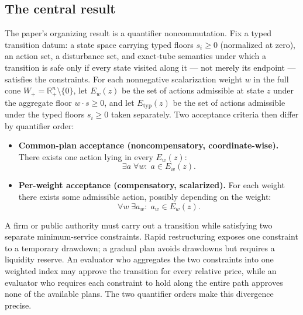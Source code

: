 \documentclass[review,11pt]{elsarticle}
\providecommand{\tightlist}{\setlength{\itemsep}{0pt}\setlength{\parskip}{0pt}}
\begin{document}
\subsection{The central result}\label{the-central-result}

The paper's organizing result is a quantifier noncommutation. Fix a
typed transition datum: a state space carrying typed floors
\(s_i \ge 0\) (normalized at zero), an action set, a disturbance set,
and exact-tube semantics under which a transition is safe only if every
state visited along it --- not merely its endpoint --- satisfies the
constraints. For each nonnegative scalarization weight \(w\) in the full
cone \(W_+ = \mathbb{R}^n_+ \setminus \{0\}\), let \(E_w(z)\) be the set
of actions admissible at state \(z\) under the aggregate floor
\(w \cdot s \ge 0\), and let \(E_{\mathrm{typ}}(z)\) be the set of
actions admissible under the typed floors \(s_i \ge 0\) taken
separately. Two acceptance criteria then differ by quantifier order:

\begin{itemize}
\tightlist
\item
  \textbf{Common-plan acceptance (noncompensatory, coordinate-wise).} There exists one
  action lying in every \(E_w(z)\):
  \[\exists a\; \forall w:\; a \in E_w(z).\]
\item
  \textbf{Per-weight acceptance (compensatory, scalarized).} For each weight there
  exists some admissible action, possibly depending on the weight:
  \[\forall w\; \exists a_w:\; a_w \in E_w(z).\]
\end{itemize}

A firm or public authority must carry out a transition while satisfying
two separate minimum-service constraints. Rapid restructuring exposes one
constraint to a temporary drawdown; a gradual plan avoids drawdowns but
requires a liquidity reserve. An evaluator who aggregates the two
constraints into one weighted index may approve the transition for every
relative price, while an evaluator who requires each constraint to hold
along the entire path approves none of the available plans. The
two quantifier orders make this divergence precise.
\end{document}
